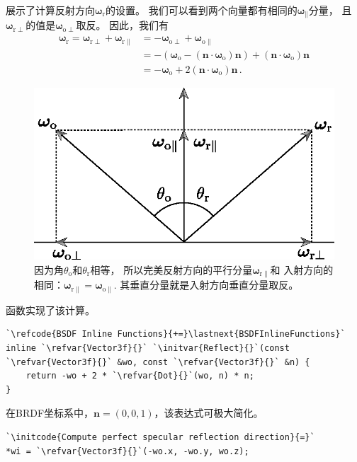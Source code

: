 展示了计算反射方向${\bm\omega}_{\mathrm{r}}$的设置。
我们可以看到两个向量都有相同的${\bm\omega}_{\parallel}$分量，
且${\bm\omega}_{\mathrm{r}\perp}$的值是${\bm\omega}_{\mathrm{o}\perp}$取反。
因此，我们有
\begin{align}
    \label{eq:8.5}
    {\bm\omega}_{\mathrm{r}}={\bm\omega}_{\mathrm{r}\perp}+{\bm\omega}_{\mathrm{r}\parallel} & =-{\bm\omega}_{\mathrm{o}\perp}+{\bm\omega}_{\mathrm{o}\parallel}\nonumber                                                        \\
                                                                                             & =-({\bm\omega}_{\mathrm{o}}-({\bm n}\cdot{\bm\omega}_{\mathrm{o}}){\bm n})+({\bm n}\cdot{\bm\omega}_{\mathrm{o}}){\bm n}\nonumber \\
                                                                                             & =-{\bm\omega}_{\mathrm{o}}+2({\bm n}\cdot{\bm\omega}_{\mathrm{o}}){\bm n}\, .
\end{align}
\begin{figure}[htbp]
    \centering
    \includegraphics[width=0.5\linewidth]{Pictures/chap08/Perfectreflectioncomponents.eps}
    \caption{因为角$\theta_{\mathrm{o}}$和$\theta_{\mathrm{r}}$相等，
    所以完美反射方向的平行分量${\bm\omega}_{\mathrm{r}\parallel}$和
    入射方向的相同：${\bm\omega}_{\mathrm{r}\parallel}={\bm\omega}_{\mathrm{o}\parallel}$.
    其垂直分量就是入射方向垂直分量取反。}
    \label{fig:8.8}
\end{figure}

函数实现了该计算。
\begin{lstlisting}
`\refcode{BSDF Inline Functions}{+=}\lastnext{BSDFInlineFunctions}`
inline `\refvar{Vector3f}{}` `\initvar{Reflect}{}`(const `\refvar{Vector3f}{}` &wo, const `\refvar{Vector3f}{}` &n) {
    return -wo + 2 * `\refvar{Dot}{}`(wo, n) * n;
}
\end{lstlisting}

在BRDF坐标系中，${\bm n}=(0,0,1)$，该表达式可极大简化。
\begin{lstlisting}
`\initcode{Compute perfect specular reflection direction}{=}`
*wi = `\refvar{Vector3f}{}`(-wo.x, -wo.y, wo.z);
\end{lstlisting}

